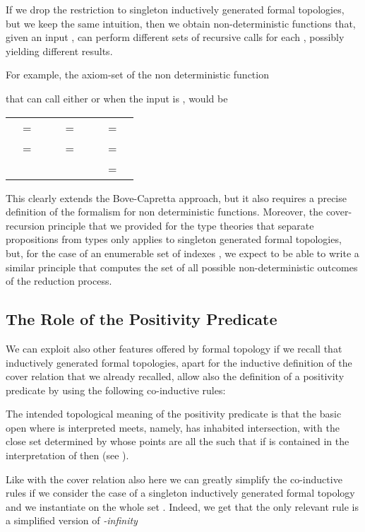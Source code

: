 \documentclass[copyright,creativecommons]{eptcs}
\begin{document}
If we drop the restriction to singleton inductively generated formal topologies,
but we keep the same intuition, then we obtain non-deterministic functions
that, given an input , can perform different sets  of recursive
calls for each , possibly yielding different results.

For example, the axiom-set of the non deterministic function

that can call either  or  when the input is , would be\\

\begin{tabular}{l@{ }l@{ }ll@{ }l@{ }ll@{ }l@{ }l}
 & = &  &  & = &  &  &=& \\
 & = &  &  & = &  &
& = &\\ &&&&&&  &=& 
\end{tabular}

This clearly extends the Bove-Capretta approach, but it also requires a precise 
definition of the formalism for non deterministic functions.
Moreover, the cover-recursion principle that we provided for the type theories 
that separate propositions from types only applies to singleton generated 
formal topologies, but, for the case of an enumerable set of indexes , 
we expect to be able to write a similar principle that computes the set of 
all possible non-deterministic outcomes of the reduction process.


\subsection{The Role of the Positivity Predicate}

We can exploit also other features offered by formal topology if we recall that inductively generated 
formal topologies, apart for the inductive definition of the cover relation that we already recalled, allow also 
the definition of a positivity predicate by using the following co-inductive rules:


The intended topological meaning of the positivity predicate  is that the basic open where
 is interpreted meets, namely, has inhabited intersection, with the close set determined by
 whose points are all the  such that if  is contained in the interpretation
of  then  (see \cite{Sam02}).

Like with the cover relation also here we can greatly simplify the co-inductive rules if we
consider the case of a singleton inductively generated formal topology and we instantiate 
 on the whole set .
Indeed, we get that the only relevant rule is a simplified version of {\em -infinity}
\end{document}
